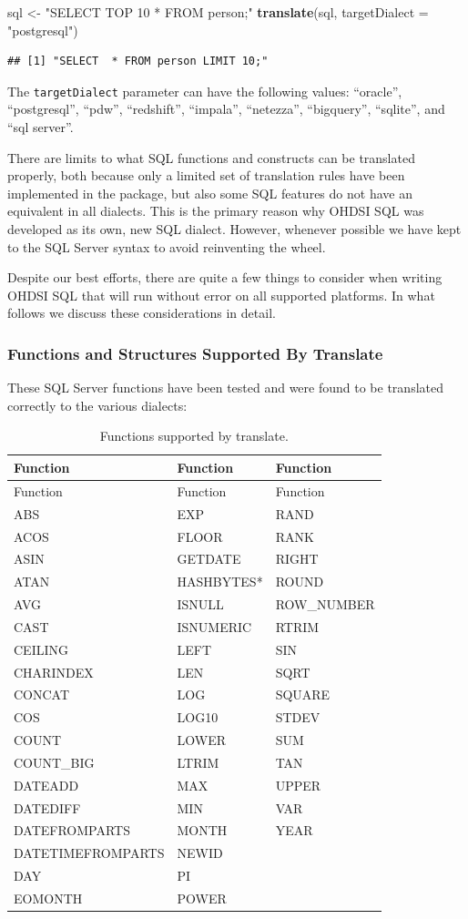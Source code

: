 \documentclass[11pt]{book}
\newenvironment{Shaded}{\begin{snugshade}}{\end{snugshade}}
\newcommand{\KeywordTok}[1]{\textcolor[rgb]{0.13,0.29,0.53}{\textbf{#1}}}
\newcommand{\DataTypeTok}[1]{\textcolor[rgb]{0.13,0.29,0.53}{#1}}
\newcommand{\StringTok}[1]{\textcolor[rgb]{0.31,0.60,0.02}{#1}}
\newcommand{\NormalTok}[1]{#1}
\theoremstyle{definition}
\theoremstyle{definition}
\theoremstyle{definition}
\theoremstyle{remark}
\let\BeginKnitrBlock\begin \let\EndKnitrBlock\end
\begin{document}
\begin{Shaded}
\begin{Highlighting}[]
\NormalTok{sql <-}\StringTok{ "SELECT TOP 10 * FROM person;"}
\KeywordTok{translate}\NormalTok{(sql, }\DataTypeTok{targetDialect =} \StringTok{"postgresql"}\NormalTok{)}
\end{Highlighting}
\end{Shaded}

\begin{verbatim}
## [1] "SELECT  * FROM person LIMIT 10;"
\end{verbatim}

The \texttt{targetDialect} parameter can have the following values:
``oracle'', ``postgresql'', ``pdw'', ``redshift'', ``impala'',
``netezza'', ``bigquery'', ``sqlite'', and ``sql server''.

\BeginKnitrBlock{rmdimportant}
There are limits to what SQL functions and constructs can be translated
properly, both because only a limited set of translation rules have been
implemented in the package, but also some SQL features do not have an
equivalent in all dialects. This is the primary reason why OHDSI SQL was
developed as its own, new SQL dialect. However, whenever possible we
have kept to the SQL Server syntax to avoid reinventing the wheel.
\EndKnitrBlock{rmdimportant}

Despite our best efforts, there are quite a few things to consider when
writing OHDSI SQL that will run without error on all supported
platforms. In what follows we discuss these considerations in detail.

\subsubsection*{Functions and Structures Supported By
Translate}\label{functions-and-structures-supported-by-translate}

These SQL Server functions have been tested and were found to be
translated correctly to the various
dialects:

\begin{longtable}[]{@{}lll@{}}
\caption{\label{tab:sqlFunctions} Functions supported by
translate.}\tabularnewline
\toprule
Function & Function & Function\tabularnewline
\midrule
\endfirsthead
\toprule
Function & Function & Function\tabularnewline
\midrule
\endhead
ABS & EXP & RAND\tabularnewline
ACOS & FLOOR & RANK\tabularnewline
ASIN & GETDATE & RIGHT\tabularnewline
ATAN & HASHBYTES* & ROUND\tabularnewline
AVG & ISNULL & ROW\_NUMBER\tabularnewline
CAST & ISNUMERIC & RTRIM\tabularnewline
CEILING & LEFT & SIN\tabularnewline
CHARINDEX & LEN & SQRT\tabularnewline
CONCAT & LOG & SQUARE\tabularnewline
COS & LOG10 & STDEV\tabularnewline
COUNT & LOWER & SUM\tabularnewline
COUNT\_BIG & LTRIM & TAN\tabularnewline
DATEADD & MAX & UPPER\tabularnewline
DATEDIFF & MIN & VAR\tabularnewline
DATEFROMPARTS & MONTH & YEAR\tabularnewline
DATETIMEFROMPARTS & NEWID &\tabularnewline
DAY & PI &\tabularnewline
EOMONTH & POWER &\tabularnewline
\bottomrule
\end{longtable}
\end{document}
